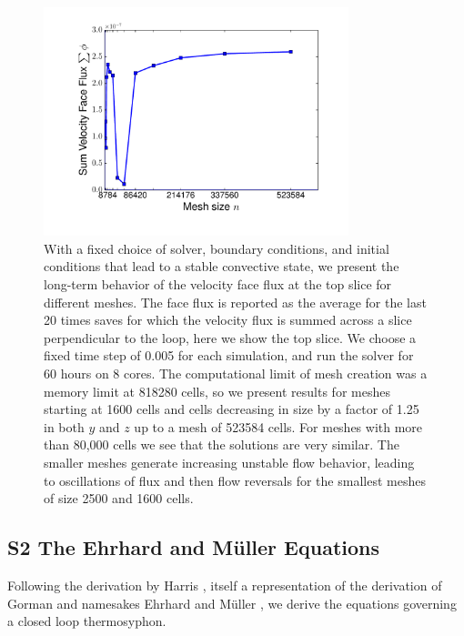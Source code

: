 \documentclass[pre,twocolumn,twoside,byrevtex,superscriptaddress]{revtex4}
\begin{document}
\begin{figure}[h!]
  \centering
    \includegraphics[width=0.79\textwidth]{fig12_Flux-end-20-times.pdf}
  \caption[Long-term behavior for different meshes]
  {
    With a fixed choice of solver, boundary conditions, and initial conditions that lead to a stable convective state, we present the long-term behavior of the velocity face flux at the top slice for different meshes.
    The face flux is reported as the average for the last 20 times saves for which the velocity flux is summed across a slice perpendicular to the loop, here we show the top slice.
    We choose a fixed time step of 0.005 for each simulation, and run the solver for 60 hours on 8 cores.
    The computational limit of mesh creation was a memory limit at 818280 cells, so we present results for meshes starting at 1600 cells and cells decreasing in size by a factor of 1.25 in both $y$ and $z$ up to a mesh of 523584 cells.
    For meshes with more than 80,000 cells we see that the solutions are very similar.
    The smaller meshes generate increasing unstable flow behavior, leading to oscillations of flux and then flow reversals for the smallest meshes of size 2500 and 1600 cells.
  }
  \label{fig:meshverification}
\end{figure}

\clearpage
\pagebreak
\subsection*{S2 The Ehrhard and M\"{u}ller Equations}
\label{S2}

Following the derivation by Harris \cite{harris2011predicting}, itself a representation of the derivation of Gorman \cite{gorman1986} and namesakes Ehrhard and M\"{u}ller \cite{ehrhard1990dynamical}, we derive the equations governing a closed loop thermosyphon.
\end{document}
